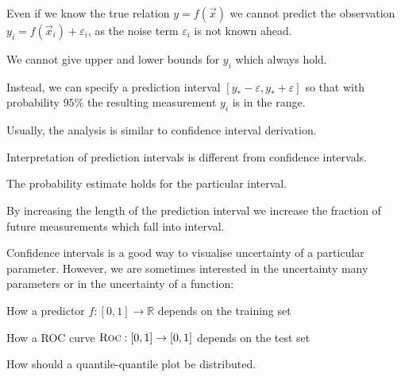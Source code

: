 \documentclass[landscape,footrule]{foils}
\begin{document}

Even if we know the true relation $y=f(\vec{x})$ we cannot predict the observation $y_{i}=f(\vec{x}_i)+\varepsilon_i$, as the noise term $\varepsilon_{i}$ is not known ahead.
\begin{triangles}
\item We cannot give upper and lower bounds for $y_i$ which always hold.
\end{triangles}
\vspace*{4ex}

Instead, we can specify a prediction interval $[y_*-\varepsilon, y_*+\varepsilon]$ so that with probability $95\%$ the resulting measurement $y_i$ is in the range.
\begin{triangles}
\item Usually, the analysis is similar to confidence interval derivation.
\end{triangles}  
\vspace*{4ex}

Interpretation of prediction intervals is different from confidence intervals.

\begin{triangles}
\item The probability estimate holds for the particular interval.
\end{triangles}  



By increasing the length of the prediction interval we increase the fraction of future measurements which fall into interval.




Confidence intervals is a good way to visualise uncertainty of a particular parameter.
However, we are sometimes interested in the uncertainty many parameters or in the uncertainty of a function:
\begin{triangles}
\item How a predictor $f:[0,1]\to\mathbb{R}$ depends on the training set
\item How a ROC curve $\textsc{Roc}:[0,1]\to[0,1]$ depends on the test set
\item How should a quantile-quantile plot be distributed.
\end{triangles}
\vspace*{4ex}
\end{document}
